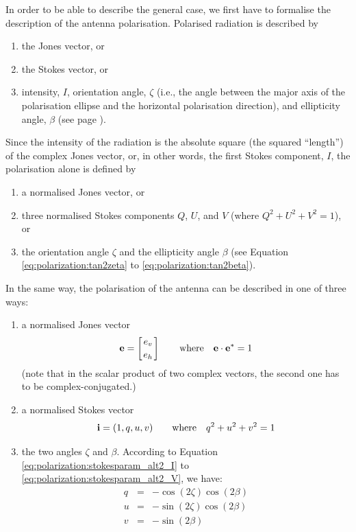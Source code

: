In order to be able to describe the general case, we first have to
formalise the description of the antenna polarisation.  Polarised
radiation is described by
\begin{enumerate}
\item 
the Jones vector, or 
\item the Stokes
vector, or
\item intensity, $I$, orientation angle, $\zeta$
(i.e., the angle between the major axis of the polarisation ellipse and
the horizontal polarisation direction), %
and ellipticity angle, $\beta$ (see
page \pageref{def:ellipticity-angle}).
\end{enumerate}
Since the intensity of the
radiation is the absolute square (the squared ``length'') of the
complex Jones vector, or, in other words, the first Stokes component,
$I$, the polarisation alone is defined by
\begin{enumerate}
\item a normalised Jones
vector, or
\item three normalised Stokes components $Q$, $U$, and $V$
(where $Q^2 + U^2 + V^2 = 1$), or 
\item the orientation angle $\zeta$
and the ellipticity angle $\beta$ (see
Equation \ref{eq:polarization:tan2zeta} to \ref{eq:polarization:tan2beta}).
\end{enumerate}
In the same way, the polarisation of the antenna can be described in
one of three ways:
\begin{enumerate}
\item a normalised Jones vector
\begin{equation}
\mathbf{e}= \left[e_v \atop e_h\right]\qquad
   \mbox{where}\quad \mathbf{e}\cdot\mathbf{e}^\ast = 1
 \end{equation}
(note  that in the scalar product of two complex vectors, the second one
has to be complex-conjugated.)

\item a normalised Stokes vector 
\begin{equation}
\mathbf{i} = (1, q, u, v)\qquad
   \mbox{where}\quad q^2+u^2+v^2=1
 \end{equation}
 
\item the
  two angles $\zeta$ and $\beta$.  According to
  Equation \ref{eq:polarization:stokesparam_alt2_I}
  to \ref{eq:polarization:stokesparam_alt2_V}, we have:
\begin{eqnarray}
  \label{eq:polarization:antenna-q}
 q &=&  - \cos(2\zeta)\cos(2\beta)\\ 
  \label{eq:polarization:antenna-u}
 u &=& - \sin(2\zeta)\cos(2\beta)\\
  \label{eq:polarization:antenna-v}
 v &=& - \sin(2\beta)
\end{eqnarray}
\end{enumerate}

